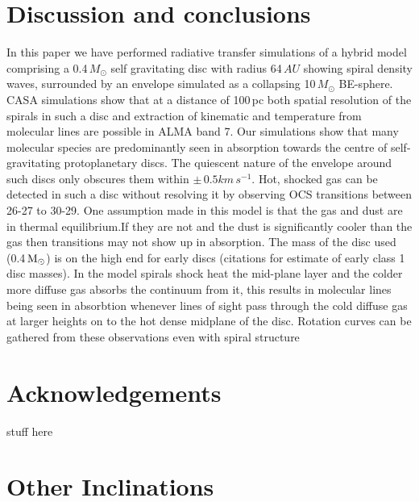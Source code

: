\documentclass[useAMS,usenatbib]{mn2e}
\begin{document}
\section{Discussion and conclusions} \label{sec:discussion}

In this paper we have performed radiative transfer simulations of a hybrid model comprising a 0.4$\, M_\odot$ self gravitating disc with radius 64$\,AU$ showing spiral density waves, surrounded by an envelope simulated as a collapsing 10$\,M_\odot$ BE-sphere. CASA simulations show that at a distance of 100$\,$pc both spatial resolution of the spirals in such a disc and extraction of kinematic and temperature from molecular lines are possible in ALMA band 7. Our simulations show that many  molecular species are predominantly seen in absorption towards the centre of  self-gravitating protoplanetary discs. The quiescent nature of the envelope around such discs only obscures them within $\pm\,0.5 km\,s^{-1}$.\newline
Hot, shocked gas can be detected in such a disc without resolving it by observing OCS transitions between 26-27 to 30-29.\newline
One assumption made in this model is that the gas and dust are in thermal equilibrium.If they are not and the dust is significantly cooler than the gas then transitions may not show up in absorption.\newline
The mass of the disc used (0.4$\,\rm{M}_\odot$) is on the high end for early discs (citations for estimate of early class 1 disc masses).\newline 
In the model spirals shock heat the mid-plane layer and the colder more diffuse gas absorbs the continuum from it, this results in molecular lines being seen in absorbtion whenever lines of sight pass through the cold diffuse gas at larger heights on to the hot dense midplane of the disc. Rotation curves can be gathered from these observations even with spiral structure\newline




\section*{Acknowledgements}

stuff here
\newpage


\appendix

\section[]{Other Inclinations}
\end{document}
